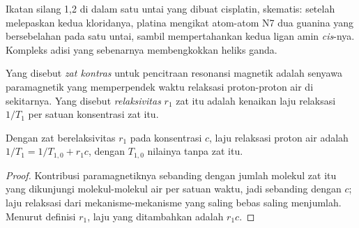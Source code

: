 \begin{omfigure}

{\small Ikatan silang 1,2 di dalam satu untai yang dibuat cisplatin, skematis: setelah
melepaskan kedua kloridanya, platina mengikat atom-atom N7 dua guanina yang bersebelahan
pada satu untai, sambil mempertahankan kedua ligan amin \textit{cis}-nya. Kompleks adisi yang sebenarnya
membengkokkan heliks ganda.}
\end{omfigure}

\begin{definition}\label{def:b3:bioinorganic:contrast}
Yang disebut \emph{zat kontras} untuk pencitraan resonansi magnetik adalah
senyawa paramagnetik yang memperpendek waktu relaksasi proton-proton air di
sekitarnya. Yang disebut \emph{relaksivitas} $r_1$ zat itu adalah kenaikan
laju relaksasi $1/T_1$ per satuan konsentrasi zat itu.
\end{definition}

\begin{proposition}\label{prop:b3:bioinorganic:relaxivity}
Dengan zat berelaksivitas $r_1$ pada konsentrasi $c$, laju relaksasi proton
air adalah $1/T_1 = 1/T_{1,0} + r_1c$, dengan $T_{1,0}$ nilainya tanpa zat itu.
\end{proposition}

\begin{proof}
Kontribusi paramagnetiknya sebanding dengan jumlah molekul zat itu
yang dikunjungi molekul-molekul air per satuan waktu, jadi sebanding dengan $c$; laju relaksasi dari
mekanisme-mekanisme yang saling bebas saling menjumlah. Menurut definisi $r_1$, laju yang ditambahkan adalah $r_1c$.
\end{proof}


